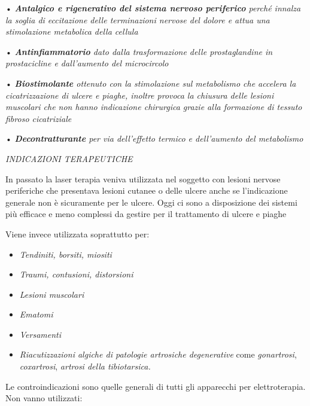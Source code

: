 \documentclass[]{article}
\begin{document}
• \emph{\textbf{Antalgico e rigenerativo del sistema nervoso periferico}
perché innalza la soglia di eccitazione delle terminazioni nervose del
dolore e attua una stimolazione metabolica della cellula}

• \emph{\textbf{Antinfiammatorio} dato dalla trasformazione delle
prostaglandine in prostacicline e dall'aumento del microcircolo}

• \emph{\textbf{Biostimolante} ottenuto con la stimolazione sul
metabolismo che accelera la cicatrizzazione di ulcere e piaghe, inoltre
provoca la chiusura delle lesioni muscolari che non hanno indicazione
chirurgica grazie alla formazione di tessuto fibroso cicatriziale}

• \emph{\textbf{Decontratturante} per via dell'effetto termico e
dell'aumento del metabolismo}

\emph{INDICAZIONI TERAPEUTICHE}

In passato la laser terapia veniva utilizzata nel soggetto con lesioni
nervose periferiche che presentava lesioni cutanee o delle ulcere anche
se l'indicazione generale non è sicuramente per le ulcere. Oggi ci sono
a disposizione dei sistemi più efficace e meno complessi da gestire per
il trattamento di ulcere e piaghe

Viene invece utilizzata soprattutto per:

\begin{itemize}
\item
  \emph{Tendiniti, borsiti, miositi}
\item
  \emph{Traumi, contusioni, distorsioni}
\item
  \emph{Lesioni muscolari}
\item
  \emph{Ematomi}
\item
  \emph{Versamenti}
\item
  \emph{Riacutizzazioni algiche di patologie artrosiche degenerative}
  come \emph{gonartrosi}, \emph{coxartrosi}, \emph{artrosi della
  tibiotarsica.}
\end{itemize}

Le controindicazioni sono quelle generali di tutti gli apparecchi per
elettroterapia. Non vanno utilizzati:
\end{document}
